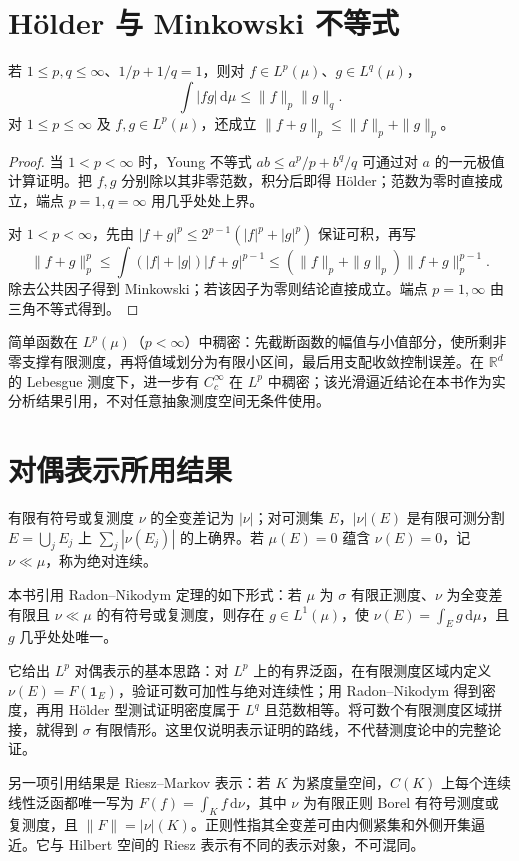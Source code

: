 \documentclass[UTF8,12pt,a4paper,fontset=fandol]{ctexbook}
\begin{document}
\section{Hölder 与 Minkowski 不等式}
\begin{proposition}\label{prop:fa-holder-minkowski}
若 $1\leq p,q\leq\infty$、$1/p+1/q=1$，则对 $f\in L^p(\mu)$、$g\in L^q(\mu)$，
\[
 \int|fg|\,\mathrm d\mu\leq\|f\|_p\|g\|_q.
\]
对 $1\leq p\leq\infty$ 及 $f,g\in L^p(\mu)$，还成立 $\|f+g\|_p\leq\|f\|_p+\|g\|_p$。
\end{proposition}
\begin{proof}
当 $1<p<\infty$ 时，Young 不等式 $ab\leq a^p/p+b^q/q$ 可通过对 $a$ 的一元极值计算证明。把 $f,g$ 分别除以其非零范数，积分后即得 Hölder；范数为零时直接成立，端点 $p=1,q=\infty$ 用几乎处处上界。

对 $1<p<\infty$，先由 $|f+g|^p\leq2^{p-1}(|f|^p+|g|^p)$ 保证可积，再写
\[
 \|f+g\|_p^p
 \leq\int(|f|+|g|)|f+g|^{p-1}
 \leq(\|f\|_p+\|g\|_p)\|f+g\|_p^{p-1}.
\]
除去公共因子得到 Minkowski；若该因子为零则结论直接成立。端点 $p=1,\infty$ 由三角不等式得到。
\end{proof}
简单函数在 $L^p(\mu)$（$p<\infty$）中稠密：先截断函数的幅值与小值部分，使所剩非零支撑有限测度，再将值域划分为有限小区间，最后用支配收敛控制误差。在 $\mathbb R^d$ 的 Lebesgue 测度下，进一步有 $C_c^\infty$ 在 $L^p$ 中稠密；该光滑逼近结论在本书作为实分析结果引用，不对任意抽象测度空间无条件使用。

\section{对偶表示所用结果}
有限有符号或复测度 $\nu$ 的全变差记为 $|\nu|$；对可测集 $E$，$|\nu|(E)$ 是有限可测分割 $E=\bigcup_jE_j$ 上 $\sum_j|\nu(E_j)|$ 的上确界。若 $\mu(E)=0$ 蕴含 $\nu(E)=0$，记 $\nu\ll\mu$，称为绝对连续。

本书引用 Radon--Nikodym 定理的如下形式：若 $\mu$ 为 $\sigma$ 有限正测度、$\nu$ 为全变差有限且 $\nu\ll\mu$ 的有符号或复测度，则存在 $g\in L^1(\mu)$，使 $\nu(E)=\int_Eg\,\mathrm d\mu$，且 $g$ 几乎处处唯一。

它给出 $L^p$ 对偶表示的基本思路：对 $L^p$ 上的有界泛函，在有限测度区域内定义 $\nu(E)=F(\mathbf1_E)$，验证可数可加性与绝对连续性；用 Radon--Nikodym 得到密度，再用 Hölder 型测试证明密度属于 $L^q$ 且范数相等。将可数个有限测度区域拼接，就得到 $\sigma$ 有限情形。这里仅说明表示证明的路线，不代替测度论中的完整论证。

另一项引用结果是 Riesz--Markov 表示：若 $K$ 为紧度量空间，$C(K)$ 上每个连续线性泛函都唯一写为 $F(f)=\int_Kf\,\mathrm d\nu$，其中 $\nu$ 为有限正则 Borel 有符号测度或复测度，且 $\|F\|=|\nu|(K)$。正则性指其全变差可由内侧紧集和外侧开集逼近。它与 Hilbert 空间的 Riesz 表示有不同的表示对象，不可混同。
\end{document}
